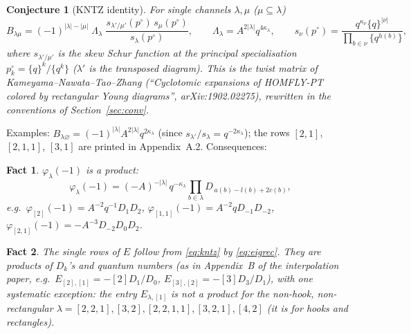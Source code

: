 \documentclass[11pt]{article}
\newtheorem{conjecture}{Conjecture}
\newtheorem{fact}{Fact}
\newcommand{\Lam}{\Lambda}
\newcommand{\vac}{\varnothing}
\begin{document}
\begin{conjecture}[KNTZ identity]\label{conj:kntz}
For single channels $\lambda,\mu$ ($\mu\subseteq\lambda$)
\begin{equation}\label{eq:kntz}
B_{\lambda\mu}=(-1)^{|\lambda|-|\mu|}\;\Lam_\lambda\;
\frac{s_{\lambda'/\mu'}(p^\circ)\,s_{\mu}(p^\circ)}{s_{\lambda}(p^\circ)},\qquad
\Lam_\lambda=A^{2|\lambda|}q^{4\kappa_\lambda},\qquad
s_\nu(p^\circ)=\frac{q^{\kappa_\nu}\{q\}^{|\nu|}}{\prod_{b\in\nu}\{q^{h(b)}\}},
\end{equation}
where $s_{\lambda'/\mu'}$ is the skew Schur function at the principal specialisation $p^\circ_k=\{q\}^k/\{q^k\}$
($\lambda'$ is the transposed diagram).  This is the twist matrix of Kameyama--Nawata--Tao--Zhang (``Cyclotomic
expansions of HOMFLY-PT colored by rectangular Young diagrams'', arXiv:1902.02275), rewritten in the conventions of
Section~\ref{sec:conv}.
\end{conjecture}

Examples: $B_{\lambda\vac}=(-1)^{|\lambda|}A^{2|\lambda|}q^{2\kappa_\lambda}$ (since $s_{\lambda'}/s_\lambda=q^{-2\kappa_\lambda}$);
the rows $[2,1]$, $[2,1,1]$, $[3,1]$ are printed in Appendix~A.2.  Consequences:

\begin{fact}\label{fact:phi}
$\varphi_\lambda(-1)$ is a product:
\begin{equation}\label{eq:phiprod}
\varphi_\lambda(-1)=(-A)^{-|\lambda|}\,q^{-\kappa_\lambda}\prod_{b\in\lambda}D_{\,a(b)-l(b)+2c(b)} ,
\end{equation}
e.g.\ $\varphi_{[2]}(-1)=A^{-2}q^{-1}D_1D_2$, $\varphi_{[1,1]}(-1)=A^{-2}qD_{-1}D_{-2}$,
$\varphi_{[2,1]}(-1)=-A^{-3}D_{-2}D_{0}D_{2}$.
\end{fact}

\begin{fact}\label{fact:E}
The single rows of $E$ follow from \eqref{eq:kntz} by \eqref{eq:eigrec}.  They are products of $D_k$'s and quantum
numbers (as in Appendix~B of the interpolation paper, e.g.\ $E_{[2],[1]}=-[2]D_1/D_0$, $E_{[3],[2]}=-[3]D_3/D_1$),
with one systematic exception: the entry $E_{\lambda,[1]}$ is not a product for the non-hook, non-rectangular
$\lambda=[2,2,1],[3,2],[2,2,1,1],[3,2,1],[4,2]$ (it is for hooks and rectangles).
\end{fact}
\end{document}
